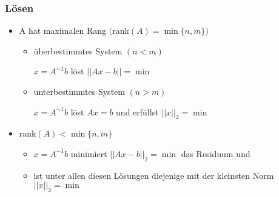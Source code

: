 \subsubsection{Lösen}
\begin{itemize}
	\item A hat maximalen Rang $($rank$(A) = \min\{n,m\})$ 
		\begin{itemize}
			\item überbestimmtes System $(n < m)$
		
			$x = A^{\sim1}b$ löst $||Ax-b||=\min$
			\item unterbestimmtes System $(n > m)$
			
			$x = A^{\sim1}b$ löst $Ax=b$ und erfüllst $||x||_2=\min$
		\end{itemize}
	\item rank$(A)<\min\{n,m\}$
		\begin{itemize}
			\item $x = A^{\sim1}b$ minimiert $||Ax-b||_2=\min$ das Residuum und 
			\item ist unter allen diesen Lösungen diejenige mit der kleinsten Norm $||x||_2=\min$
		\end{itemize}
\end{itemize}